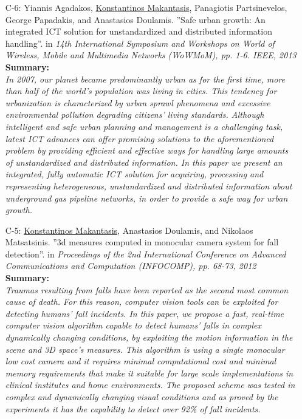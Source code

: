 \documentclass[a4paper,10pt]{article}
\begin{document}
\begin{itemize}
	\item [C-6:]Yiannis Agadakos, \underline{Konstantinos Makantasis}, Panagiotis Partsinevelos, George Papadakis, and Anastasios Doulamis. ''Safe urban growth: An integrated ICT solution for unstandardized and distributed information handling''. in \textit{14th International Symposium and Workshops on World of Wireless, Mobile and Multimedia Networks (WoWMoM), pp. 1-6. IEEE, 2013}\\
	\textbf{Summary:}\\
	\textit{In 2007, our planet became predominantly urban as for the first time, more than half of the world's population was living in cities. This tendency for urbanization is characterized by urban sprawl phenomena and excessive environmental pollution degrading citizens' living standards. Although intelligent and safe urban planning and management is a challenging task, latest ICT advances can offer promising solutions to the aforementioned problem by providing efficient and effective ways for handling large amounts of unstandardized and distributed information. In this paper we present an integrated, fully automatic ICT solution for acquiring, processing and representing heterogeneous, unstandardized and distributed information about underground gas pipeline networks, in order to provide a safe way for urban growth.}
	
	\item [C-5:]\underline{Konstantinos Makantasis}, Anastasios Doulamis, and Nikolaos Matsatsinis. ''3d measures computed in monocular camera system for fall detection''. in \textit{Proceedings of the 2nd International Conference on Advanced Communications and Computation (INFOCOMP), pp. 68-73, 2012}\\
	\textbf{Summary:}\\
	\textit{Traumas resulting from falls have been reported as the second most common cause of death. For this reason, computer vision tools can be exploited for detecting humans’ fall incidents. In this paper, we propose a fast, real-time computer vision algorithm capable to detect humans’ falls in complex dynamically changing conditions, by exploiting the motion information in the scene and 3D space’s measures. This algorithm is using a single monocular low cost camera and it requires minimal computational cost and minimal memory requirements that make it suitable for large scale implementations in clinical institutes and home environments. The proposed scheme was tested in complex and dynamically changing visual conditions and as proved by the experiments it has the capability to detect over 92\% of fall incidents.}
	

\end{itemize}
\end{document}
